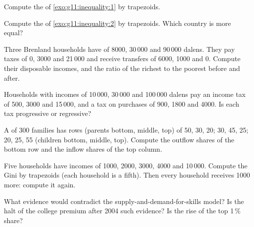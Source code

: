\begin{exercise}[$\star\star$]\label{exo:g11:inequality:6}
Compute the  of \cref{exo:g11:inequality:1} by trapezoids.
\end{exercise}

\begin{exercise}[$\star\star$]\label{exo:g11:inequality:7}
Compute the  of \cref{exo:g11:inequality:2} by trapezoids. Which country is more equal?
\end{exercise}

\begin{exercise}[$\star\star$]\label{exo:g11:inequality:8}
Three Brenland households have  of 8000, 30\,000 and 90\,000 dalens. They pay taxes of 0, 3000 and 21\,000 and receive transfers of 6000, 1000 and 0.
Compute their disposable incomes, and the ratio of the richest to the poorest before and after.
\end{exercise}

\begin{exercise}[$\star\star$]\label{exo:g11:inequality:9}
Households with incomes of 10\,000, 30\,000 and 100\,000 dalens pay an income tax of 500, 3000 and 15\,000, and a tax on purchases of 900, 1800 and 4000. Is each tax
progressive or regressive?
\end{exercise}

\begin{exercise}[$\star\star$]\label{exo:g11:inequality:10}
A  of 300 families has rows (parents bottom, middle, top) of 50, 30, 20; 30, 45, 25; 20, 25, 55 (children bottom, middle, top). Compute the outflow shares of
the bottom row and the inflow shares of the top column.
\end{exercise}

\begin{exercise}[$\star\star$]\label{exo:g11:inequality:11}
Five households have incomes of 1000, 2000, 3000, 4000 and 10\,000. Compute the Gini by trapezoids (each household is a fifth). Then every household receives 1000 more:
compute it again.
\end{exercise}

\begin{exercise}[$\star\star\star$]\label{exo:g11:inequality:12}
What evidence would contradict the supply-and-demand-for-skills model? Is the halt of the college premium after 2004 such evidence? Is the rise of the top 1\,\% share?
\end{exercise}

